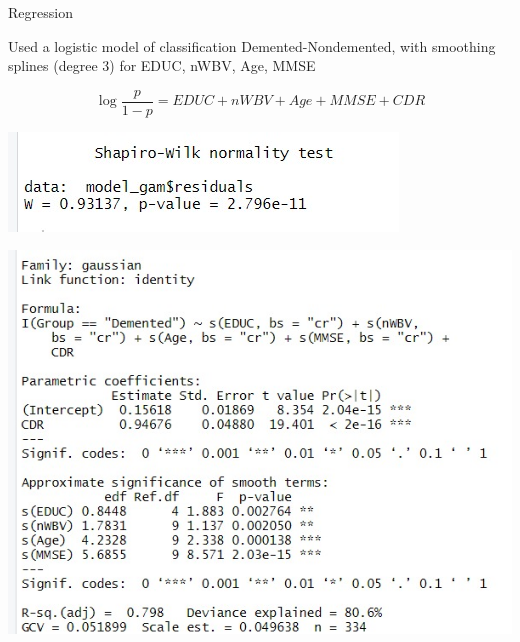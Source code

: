 \documentclass{beamer}
\begin{document}
	
	\begin{frame}{Regression}
		
		
		
		Used a logistic model of classification Demented-Nondemented, with smoothing splines (degree 3) for EDUC, nWBV, Age, MMSE
		
		$$ \log \frac{p}{1-p} = EDUC + nWBV + Age + MMSE + CDR$$
		
		
		\begin{multicols}{2}
	
	
		\begin{center}
			\includegraphics[width=\columnwidth]{regr1.jpeg}
		\end{center}
		\columnbreak
		\begin{center}
			\includegraphics[width=\columnwidth]{regr2.jpeg}
		\end{center}
		
		\end{multicols}
		
		
	\end{frame}
	
\end{document}
